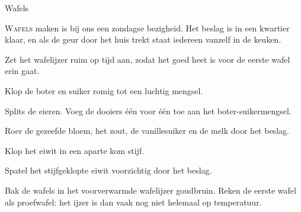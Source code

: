 \begin{recipe}{Wafels}


\lettrine{W}{afels} maken is bij ons een zondagse bezigheid. Het beslag is in een
kwartier klaar, en als de geur door het huis trekt staat iedereen vanzelf in de keuken.

\begin{ingredients}
\end{ingredients}

\begin{steps}
  \item Zet het wafelijzer ruim op tijd aan, zodat het goed heet is voor de
        eerste wafel erin gaat.
  \item Klop de boter en suiker romig tot een luchtig mengsel.
  \item Splits de eieren. Voeg de dooiers één voor één toe aan het boter-suikermengsel.
  \item Roer de gezeefde bloem, het zout, de vanillesuiker en de melk door het beslag.
  \item Klop het eiwit in een aparte kom stijf.
  \item Spatel het stijfgeklopte eiwit voorzichtig door het beslag.
  \item Bak de wafels in het voorverwarmde wafelijzer goudbruin. Reken de
        eerste wafel als proefwafel: het ijzer is dan vaak nog niet helemaal
        op temperatuur.
\end{steps}
\end{recipe}
